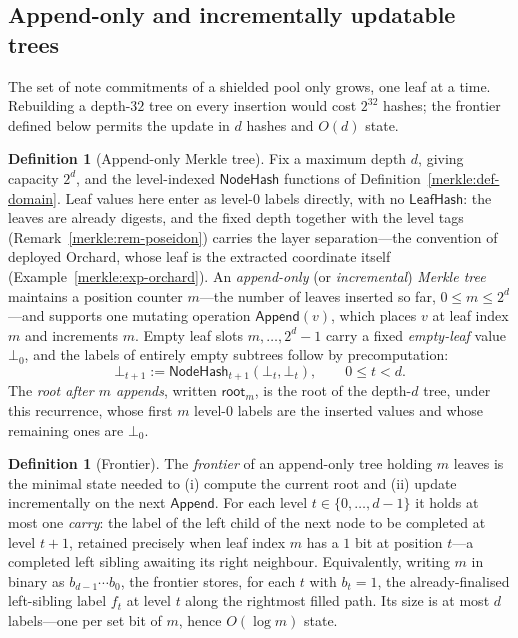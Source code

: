 \documentclass[11pt,a4paper]{article}
\theoremstyle{definition}
\newtheorem{definition}[theorem]{Definition}
\theoremstyle{remark}
\begin{document}
\subsection{Append-only and incrementally updatable trees}
\label{merkle:sec-frontier}

The set of note commitments of a shielded pool only grows, one leaf at
a time. Rebuilding a depth-\(32\) tree on every insertion would cost
\(2^{32}\) hashes; the frontier defined below permits the update in
\(d\) hashes and \(O(d)\) state.

\begin{definition}[Append-only Merkle tree]\label{merkle:def-append}
Fix a maximum depth \(d\), giving capacity \(2^d\), and the
level-indexed \(\mathsf{NodeHash}\) functions of
Definition~\ref{merkle:def-domain}. Leaf values here enter as
level-\(0\) labels directly, with no \(\mathsf{LeafHash}\): the
leaves are already digests, and the fixed depth together with the
level tags (Remark~\ref{merkle:rem-poseidon}) carries the layer
separation---the convention of deployed Orchard, whose leaf is the
extracted coordinate itself (Example~\ref{merkle:exp-orchard}). An
\emph{append-only} (or \emph{incremental}) \emph{Merkle tree}
maintains a position counter \(m\)---the number of leaves inserted so
far, \(0 \le m \le 2^d\)---and supports one mutating operation
\(\mathsf{Append}(v)\), which places \(v\) at leaf index \(m\) and
increments \(m\). Empty leaf slots \(m, \dots, 2^d - 1\) carry a
fixed \emph{empty-leaf} value \(\bot_0\), and the labels of entirely
empty subtrees follow by precomputation:
\[
\bot_{t+1} := \mathsf{NodeHash}_{t+1}(\bot_t, \bot_t),
\qquad 0 \le t < d.
\]
The \emph{root after \(m\) appends}, written \(\mathsf{root}_m\), is
the root of the depth-\(d\) tree, under this recurrence, whose first
\(m\) level-\(0\) labels are the inserted values and whose remaining
ones are \(\bot_0\).
\end{definition}

\begin{definition}[Frontier]\label{merkle:def-frontier}
The \emph{frontier} of an append-only tree holding \(m\) leaves is
the minimal state needed to (i) compute the current root and (ii)
update incrementally on the next \(\mathsf{Append}\). For each level
\(t \in \{0, \dots, d-1\}\) it holds at most one \emph{carry}: the
label of the left child of the next node to be completed at level
\(t+1\), retained precisely when leaf index \(m\) has a \(1\) bit at
position \(t\)---a completed left sibling awaiting its right
neighbour. Equivalently, writing \(m\) in binary as
\(b_{d-1} \cdots b_0\), the frontier stores, for each \(t\) with
\(b_t = 1\), the already-finalised left-sibling label \(f_t\) at
level \(t\) along the rightmost filled path. Its size is at most
\(d\) labels---one per set bit of \(m\), hence \(O(\log m)\) state.
\end{definition}
\end{document}

